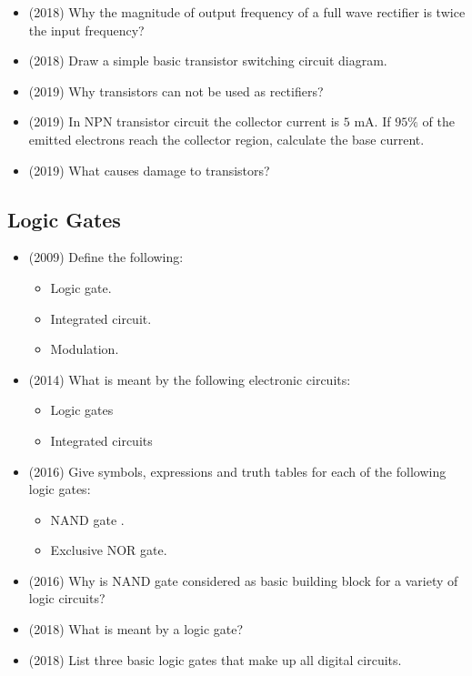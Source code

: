 \documentclass{article}
\begin{document}
\begin{itemize}
\item (2018)  Why the magnitude of output frequency of a full wave rectifier is twice the input frequency? 
\item (2018)  Draw a simple basic transistor switching circuit diagram. 
\item (2019)  Why transistors can not be used as rectifiers? 
\item (2019)  In NPN transistor circuit the collector current is $ 5$ mA. If $ 95\%$ of the emitted electrons reach the collector region, calculate the base current. 
\item (2019)  What causes damage to transistors? 
\end{itemize}

\subsection{Logic Gates}
\begin{itemize}
\item (2009)  Define the following:\begin{itemize}
\item Logic gate.
\item Integrated circuit.
\item Modulation.
\end{itemize}
\item (2014)  What is meant by the following electronic circuits:\begin{itemize}
\item Logic gates 
\item Integrated circuits
\end{itemize}
\item (2016)  Give symbols, expressions and truth tables for each of the following logic gates: \begin{itemize}
\item NAND gate .
\item Exclusive NOR gate.
\end{itemize}
\item (2016)  Why is NAND gate considered as basic building block for a variety of logic circuits?
\item (2018)  What is meant by a logic gate? 
\item (2018)  List three basic logic gates that make up all digital circuits. 
\end{itemize}
\end{document}
